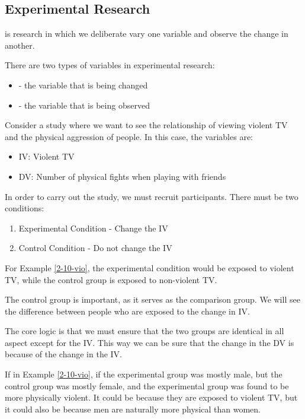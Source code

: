 \documentclass[../main/main.tex]{subfiles}
\begin{document}
\subsection{Experimental Research}
\begin{definition}
   is research in which we deliberate vary one variable and observe the change in another.
\end{definition}
There are two types of variables in experimental research:
\begin{itemize}
  \item {} - the variable that is being changed
        \item {} - the variable that is being observed
\end{itemize}
\begin{example}
  Consider a study where we want to see the relationship of viewing violent TV and the physical aggression of people. In this case, the variables are:
  \begin{itemize}
          \label{2-10-vio}
    \item IV: Violent TV
          \item DV: Number of physical fights when playing with friends
  \end{itemize}
\end{example}
In order to carry out the study, we must recruit participants. There must be two conditions:
\begin{enumerate}
  \item Experimental Condition - Change the IV
        \item Control Condition - Do not change the IV
\end{enumerate}
\begin{example}
For Example \ref{2-10-vio}, the experimental condition would be exposed to violent TV, while the control group is exposed to non-violent TV.
\end{example}

\begin{remark}
The control group is important, as it serves as the comparison group. We will see the difference between people who are exposed to the change in IV.
\end{remark}
The core logic is that we must ensure that the two groups are identical in all aspect except for the IV. This way we can be sure that the change in the DV is because of the change in the IV.

\begin{example}
  If in Example \ref{2-10-vio}, if the experimental group was mostly male, but the control group was mostly female, and the experimental group was found to be more physically violent. It could be because they are exposed to violent TV, but it could also be because men are naturally more physical than women.
\end{example}
\end{document}
